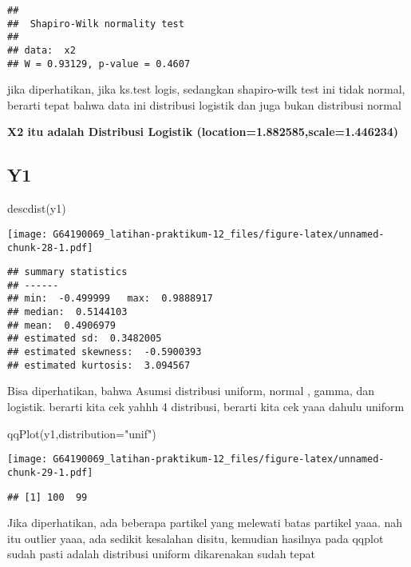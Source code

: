 \documentclass[
]{article}
\newenvironment{Shaded}{\begin{snugshade}}{\end{snugshade}}
\newcommand{\AttributeTok}[1]{\textcolor[rgb]{0.77,0.63,0.00}{#1}}
\newcommand{\FunctionTok}[1]{\textcolor[rgb]{0.00,0.00,0.00}{#1}}
\newcommand{\NormalTok}[1]{#1}
\newcommand{\StringTok}[1]{\textcolor[rgb]{0.31,0.60,0.02}{#1}}
\begin{document}
\begin{verbatim}
## 
##  Shapiro-Wilk normality test
## 
## data:  x2
## W = 0.93129, p-value = 0.4607
\end{verbatim}

jika diperhatikan, jika ks.test logis, sedangkan shapiro-wilk test ini
tidak normal, berarti tepat bahwa data ini distribusi logistik dan juga
bukan distribusi normal

\textbf{X2 itu adalah Distribusi Logistik
(location=1.882585,scale=1.446234)}

\hypertarget{y1-2}{%
\subsection{Y1}\label{y1-2}}

\begin{Shaded}
\begin{Highlighting}[]
\FunctionTok{descdist}\NormalTok{(y1)}
\end{Highlighting}
\end{Shaded}

\texttt{[image: G64190069\_latihan-praktikum-12\_files/figure-latex/unnamed-chunk-28-1.pdf]}

\begin{verbatim}
## summary statistics
## ------
## min:  -0.499999   max:  0.9888917 
## median:  0.5144103 
## mean:  0.4906979 
## estimated sd:  0.3482005 
## estimated skewness:  -0.5900393 
## estimated kurtosis:  3.094567
\end{verbatim}

Bisa diperhatikan, bahwa Asumsi distribusi uniform, normal , gamma, dan
logistik. berarti kita cek yahhh 4 distribusi, berarti kita cek yaaa
dahulu uniform

\begin{Shaded}
\begin{Highlighting}[]
\FunctionTok{qqPlot}\NormalTok{(y1,}\AttributeTok{distribution=}\StringTok{"unif"}\NormalTok{)}
\end{Highlighting}
\end{Shaded}

\texttt{[image: G64190069\_latihan-praktikum-12\_files/figure-latex/unnamed-chunk-29-1.pdf]}

\begin{verbatim}
## [1] 100  99
\end{verbatim}

Jika diperhatikan, ada beberapa partikel yang melewati batas partikel
yaaa. nah itu outlier yaaa, ada sedikit kesalahan disitu, kemudian
hasilnya pada qqplot sudah pasti adalah distribusi uniform dikarenakan
sudah tepat
\end{document}
